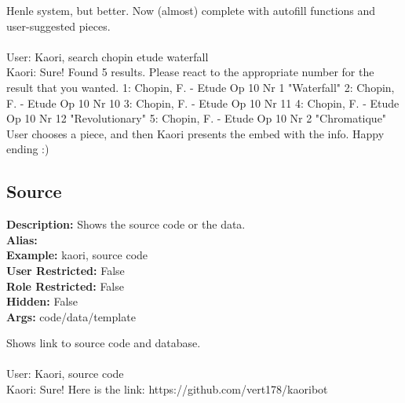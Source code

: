 \documentclass[11pt]{article}
\begin{document}
Henle system, but better. Now (almost) complete with autofill functions and user-suggested pieces.
\\ \\
User: Kaori, search chopin etude waterfall
\\ 
Kaori: Sure! Found 5 results. Please react to the appropriate number for the result that you wanted.
 1: Chopin, F. - Etude Op 10 Nr 1 "Waterfall"
 2: Chopin, F. - Etude Op 10 Nr 10
 3: Chopin, F. - Etude Op 10 Nr 11
 4: Chopin, F. - Etude Op 10 Nr 12 "Revolutionary"
 5: Chopin, F. - Etude Op 10 Nr 2 "Chromatique"
 \\
User chooses a piece, and then Kaori presents the embed with the info. Happy ending :)

\subsection{Source}
\textbf{Description: } \hspace{5pt} Shows the source code or the data. \\
\textbf{Alias: } \hspace{5pt}  \\
\textbf{Example: } \hspace{5pt} kaori, source code \\
\textbf{User Restricted: } \hspace{5pt} False\\
\textbf{Role Restricted: } \hspace{5pt} False\\
\textbf{Hidden: } \hspace{5pt} False\\
\textbf{Args: } \hspace{5pt} code/data/template


Shows link to source code and database.
\\ \\
User: Kaori, source code
\\
Kaori: Sure! Here is the link: https://github.com/vert178/kaoribot
\end{document}
